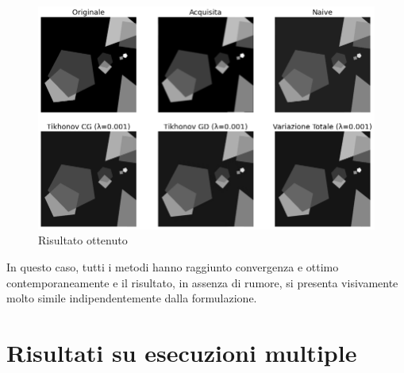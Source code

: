 \documentclass[11pt]{article}
\begin{document}
\begin{figure}[H]
    \centering
    \includegraphics[width=12cm]{semiconvergenza/3/deblur_all.png}
    \caption{Risultato ottenuto}
    \label{fig:semiconv_deblur3}
\end{figure}
In questo caso, tutti i metodi hanno raggiunto convergenza e ottimo contemporaneamente e il risultato, in assenza di rumore, si presenta visivamente molto simile indipendentemente dalla formulazione.



\newpage
\section{Risultati su esecuzioni multiple}
\end{document}
